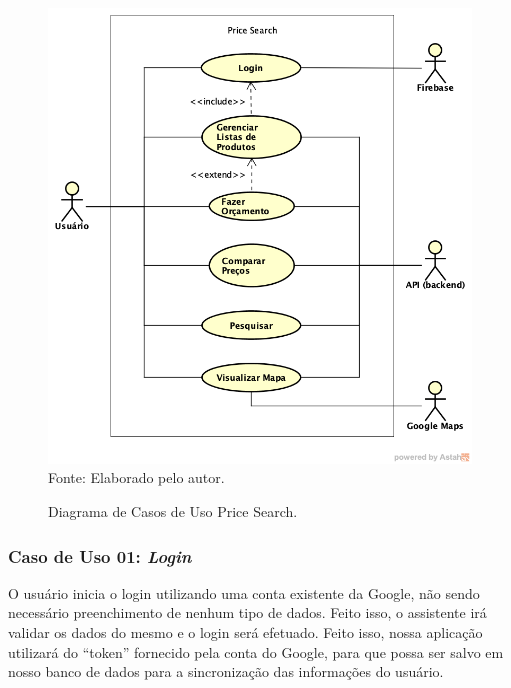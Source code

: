 \begin{figure}[!htb]
\centering
\caption{Diagrama de Casos de Uso Price Search.}
\includegraphics[width=\linewidth]{figuras/DiagramaCasosUsoPriceSearch.png}
{\footnotesize Fonte: Elaborado pelo autor.}
\end{figure}

\subsubsection{Caso de Uso 01: \textit{Login}}

O usuário inicia o login utilizando uma conta existente da Google, não sendo necessário preenchimento de nenhum tipo de dados. Feito isso, o assistente irá validar os dados do mesmo e o login será efetuado. Feito isso, nossa aplicação utilizará do ``token'' fornecido pela conta do Google, para que possa ser salvo em nosso banco de dados para a sincronização das informações do usuário.

